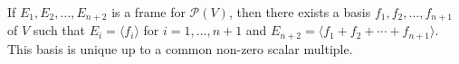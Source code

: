 If $E_1, E_2, \dots, E_{n+2}$ is a frame for $\mathcal{P}(V)$, then there exists a basis $f_1, f_2, \dots, f_{n+1}$ of $V$ such that $E_i = \langle f_i \rangle$ for $i = 1, \dots, n+1$ and $E_{n+2} = \langle f_1 + f_2 + \cdots + f_{n+1} \rangle$. This basis is unique up to a common non-zero scalar multiple.
